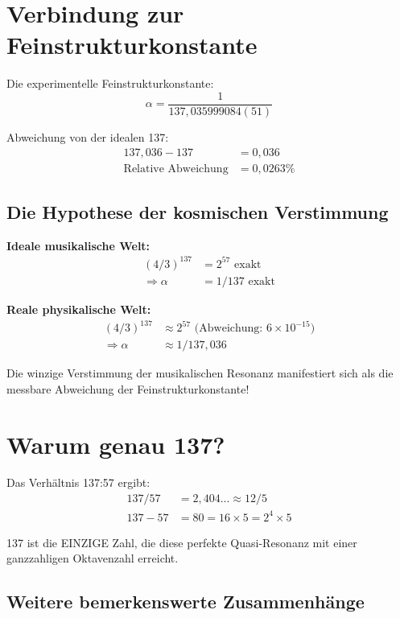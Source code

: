 	\section{Verbindung zur Feinstrukturkonstante}
	
	Die experimentelle Feinstrukturkonstante:
	\begin{equation}
		\alpha = \frac{1}{137{,}035999084(51)}
	\end{equation}
	
	Abweichung von der idealen 137:
	\begin{align}
		137{,}036 - 137 &= 0{,}036\\
		\text{Relative Abweichung} &= 0{,}0263\%
	\end{align}
	
	\subsection{Die Hypothese der kosmischen Verstimmung}
	
	\textbf{Ideale musikalische Welt:}
	\begin{align}
		(4/3)^{137} &= 2^{57} \text{ exakt}\\
		\Rightarrow \alpha &= 1/137 \text{ exakt}
	\end{align}
	
	\textbf{Reale physikalische Welt:}
	\begin{align}
		(4/3)^{137} &\approx 2^{57} \text{ (Abweichung: } 6 \times 10^{-15}\text{)}\\
		\Rightarrow \alpha &\approx 1/137{,}036
	\end{align}
	
	Die winzige Verstimmung der musikalischen Resonanz manifestiert sich als die messbare Abweichung der Feinstrukturkonstante!
	
	\section{Warum genau 137?}
	
	Das Verhältnis 137:57 ergibt:
	\begin{align}
		137/57 &= 2{,}404... \approx 12/5\\
		137 - 57 &= 80 = 16 \times 5 = 2^4 \times 5
	\end{align}
	
	137 ist die EINZIGE Zahl, die diese perfekte Quasi-Resonanz mit einer ganzzahligen Oktavenzahl erreicht.
	
	\subsection{Weitere bemerkenswerte Zusammenhänge}
	
